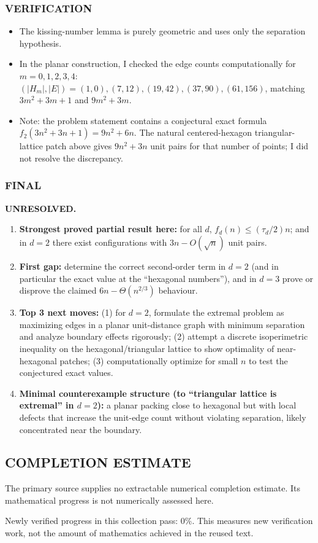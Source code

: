 \subsubsection*{VERIFICATION}
\begin{itemize}
\item The kissing-number lemma is purely geometric and uses only the separation hypothesis.
\item In the planar construction, I checked the edge counts computationally for \(m=0,1,2,3,4\):
\((|H_m|,|E|)=(1,0),(7,12),(19,42),(37,90),(61,156)\), matching \(3m^2+3m+1\) and \(9m^2+3m\).
\item Note: the problem statement contains a conjectural exact formula \(f_2(3n^2+3n+1)=9n^2+6n\). The natural centered-hexagon triangular-lattice patch above gives \(9n^2+3n\) unit pairs for that number of points; I did not resolve the discrepancy.
\end{itemize}

\subsubsection*{FINAL}
\textbf{UNRESOLVED.}
\begin{enumerate}
\item[(i)] \textbf{Strongest proved partial result here:} for all \(d\), \(f_d(n)\le (\tau_d/2)n\); and in \(d=2\) there exist configurations with \(3n-O(\sqrt n)\) unit pairs.
\item[(ii)] \textbf{First gap:} determine the correct second-order term in \(d=2\) (and in particular the exact value at the ``hexagonal numbers''), and in \(d=3\) prove or disprove the claimed \(6n-\Theta(n^{2/3})\) behaviour.
\item[(iii)] \textbf{Top 3 next moves:}
(1) for \(d=2\), formulate the extremal problem as maximizing edges in a planar unit-distance graph with minimum separation and analyze boundary effects rigorously;
(2) attempt a discrete isoperimetric inequality on the hexagonal/triangular lattice to show optimality of near-hexagonal patches;
(3) computationally optimize for small \(n\) to test the conjectured exact values.
\item[(iv)] \textbf{Minimal counterexample structure (to ``triangular lattice is extremal'' in \(d=2\)):}
a planar packing close to hexagonal but with local defects that increase the unit-edge count without violating separation, likely concentrated near the boundary.
\end{enumerate}




\subsection*{COMPLETION ESTIMATE}
The primary source supplies no extractable numerical completion estimate. Its mathematical progress is not numerically assessed here.

Newly verified progress in this collection pass: $0\%$. This measures new verification work, not the amount of mathematics achieved in the reused text.

